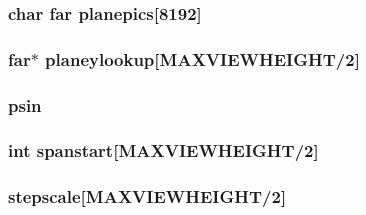 \label{WOLFHACK_8C_a7b1009cc68ef81a4eaa5e08eea2ccb74}
\hypertarget{WOLFHACK_8C_ace6436dbd4081ecd213b7715ec40c0d8}{
\subsubsection[{planepics}]{\setlength{\rightskip}{0pt plus 5cm}char far {\bf planepics}\mbox{[}8192\mbox{]}}}
\label{WOLFHACK_8C_ace6436dbd4081ecd213b7715ec40c0d8}
\hypertarget{WOLFHACK_8C_ad771d208226d5fd2ca351064a640ac2f}{
\subsubsection[{planeylookup}]{ far$\ast$ {\bf planeylookup}\mbox{[}MAXVIEWHEIGHT/2\mbox{]}}}
\label{WOLFHACK_8C_ad771d208226d5fd2ca351064a640ac2f}
\hypertarget{WOLFHACK_8C_a3f4072476e9a69dd0c2718e588fe1b4c}{
\subsubsection[{psin}]{ {\bf psin}}}
\label{WOLFHACK_8C_a3f4072476e9a69dd0c2718e588fe1b4c}
\hypertarget{WOLFHACK_8C_a4c8e4e6767346701059a389a561eab09}{
\subsubsection[{spanstart}]{\setlength{\rightskip}{0pt plus 5cm}int {\bf spanstart}\mbox{[}MAXVIEWHEIGHT/2\mbox{]}}}
\label{WOLFHACK_8C_a4c8e4e6767346701059a389a561eab09}
\hypertarget{WOLFHACK_8C_aee3e1fe06a4bbdaec4efa03285418bd5}{
\subsubsection[{stepscale}]{ {\bf stepscale}\mbox{[}MAXVIEWHEIGHT/2\mbox{]}}}
\label{WOLFHACK_8C_aee3e1fe06a4bbdaec4efa03285418bd5}
